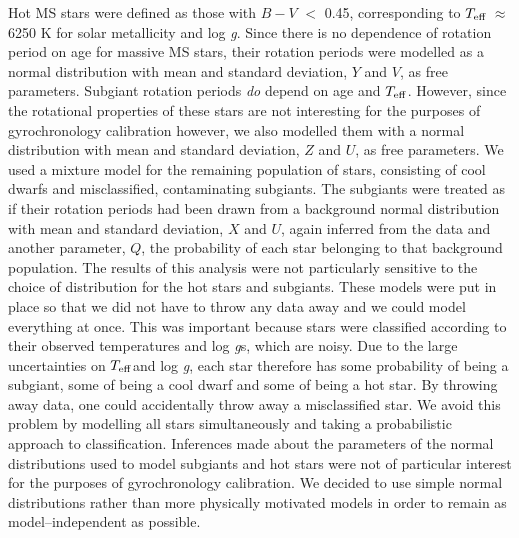 \documentclass[11pt,preprint]{aastex}
\newcommand{\logg}{log \emph{g}}
\newcommand{\teff}{$T_{\rm{eff}}$}
\begin{document}
Hot MS stars were defined as those with $B-V$ $<$ 0.45, corresponding to
\teff$~\approx$ 6250 K for solar metallicity and \logg.
Since there is no dependence of rotation period on age for massive MS stars,
their rotation periods were modelled as a normal distribution with mean and
standard deviation, $Y$ and $V$, as free parameters.
Subgiant rotation periods \emph{do} depend on age and $T_{\rm{eff}}$.
However, since the rotational properties of these stars are not interesting for
the purposes of gyrochronology calibration however, we also modelled them with
a normal distribution with mean and standard deviation, $Z$ and $U$, as free
parameters.
We used a mixture model for the remaining population of stars, consisting of
cool dwarfs and misclassified, contaminating subgiants.
The subgiants were treated as if their rotation periods had been drawn from
a background normal distribution with mean and standard deviation, $X$ and
$U$, again inferred from the data and another parameter, $Q$, the
probability of each star belonging to that background population.
The results of this analysis were not particularly sensitive to the choice of
distribution for the hot stars and subgiants.
These models were put in place so that we did not have to throw any data
away and we could model everything at once.
This was important because stars were classified according to their observed
temperatures and \logg s, which are noisy.
Due to the large uncertainties on \teff and \logg, each star therefore has some
probability of being a subgiant, some of being a cool dwarf and some of
being a hot star.
By throwing away data, one could accidentally throw away a misclassified star.
We avoid this problem by modelling all stars simultaneously and taking a
probabilistic approach to classification.
Inferences made about the parameters of the normal distributions used to model
subgiants and hot stars were not of particular interest for the purposes of
gyrochronology calibration.
We decided to use simple normal distributions rather than more physically
motivated models in order to remain as model--independent as
possible.
\end{document}
